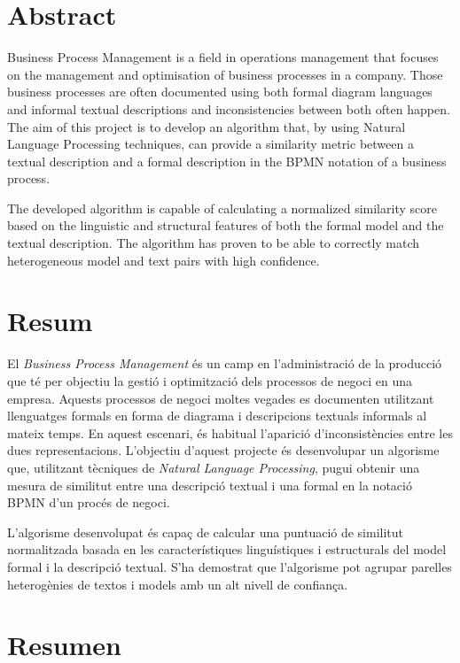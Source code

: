 \thispagestyle{empty}
\section*{Abstract} %
Business Process Management is a field in operations management that focuses on the management and optimisation of business processes in a company. Those business processes are often documented using both formal diagram languages and informal textual descriptions and inconsistencies between both often happen. The aim of this project is to develop an algorithm that, by using Natural Language Processing techniques, can provide a similarity metric between a textual description and a formal description in the BPMN notation of a business process.

The developed algorithm is capable of calculating a normalized similarity score based on the linguistic and structural features of both the formal model and the textual description. The algorithm has proven to be able to correctly match heterogeneous model and text pairs with high confidence.  

\section*{Resum} %

El \emph{Business Process Management} és un camp en l'administració de la producció que té per objectiu la gestió i optimització dels processos de negoci en una empresa. Aquests processos de negoci moltes vegades es documenten utilitzant llenguatges formals en forma de diagrama i descripcions textuals informals al mateix temps. En aquest escenari, és habitual l'aparició d'inconsistències entre les dues representacions. L'objectiu d'aquest projecte és desenvolupar un algorisme que, utilitzant tècniques de \emph{Natural Language Processing}, pugui obtenir una mesura de similitut entre una descripció textual i una formal en la notació BPMN d'un procés de negoci.

L'algorisme desenvolupat és capaç de calcular una puntuació de similitut normalitzada basada en les característiques linguístiques i estructurals del model formal i la descripció textual. S'ha demostrat que l'algorisme pot agrupar parelles heterogènies de textos i models amb un alt nivell de confiança.

\section*{Resumen} %

